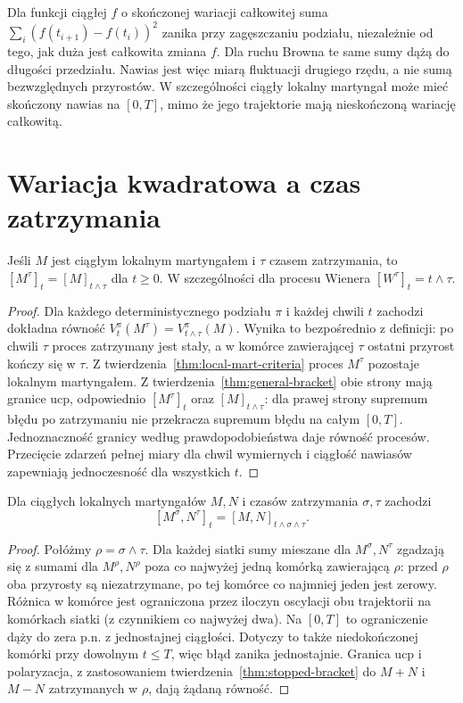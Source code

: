 \begin{uwaga}
Dla funkcji ciągłej $f$ o skończonej wariacji całkowitej
suma $\sum_i(f(t_{i+1})-f(t_i))^2$ zanika przy
zagęszczaniu podziału, niezależnie od tego, jak duża
jest całkowita zmiana $f$. Dla ruchu Browna te same
sumy dążą do długości przedziału. Nawias jest więc
miarą fluktuacji drugiego rzędu, a nie sumą bezwzględnych
przyrostów. W szczególności ciągły lokalny martyngał
może mieć skończony nawias na $[0,T]$, mimo że jego
trajektorie mają nieskończoną wariację całkowitą.
\end{uwaga}

\section{Wariacja kwadratowa a czas zatrzymania}
\begin{twierdzenie}
\label{thm:stopped-bracket}
Jeśli $M$ jest ciągłym lokalnym martyngałem i
$\tau$ czasem zatrzymania, to
$[M^\tau]_t=[M]_{t\wedge\tau}$ dla $t\ge0$.
W szczególności dla procesu Wienera
$[W^\tau]_t=t\wedge\tau$.
\end{twierdzenie}
\begin{proof}
Dla każdego deterministycznego podziału $\pi$ i każdej
chwili $t$ zachodzi dokładna równość
$V_t^\pi(M^\tau)=V_{t\wedge\tau}^\pi(M)$.
Wynika to bezpośrednio z definicji: po chwili $\tau$
proces zatrzymany jest stały, a w komórce zawierającej
$\tau$ ostatni przyrost kończy się w $\tau$.
Z twierdzenia~\ref{thm:local-mart-criteria} proces
$M^\tau$ pozostaje lokalnym martyngałem.
Z twierdzenia~\ref{thm:general-bracket} obie strony
mają granice ucp, odpowiednio $[M^\tau]_t$ oraz
$[M]_{t\wedge\tau}$: dla prawej strony supremum
błędu po zatrzymaniu nie przekracza supremum
błędu na całym $[0,T]$. Jednoznaczność granicy według
prawdopodobieństwa daje równość procesów.
Przecięcie zdarzeń pełnej miary dla chwil wymiernych
i ciągłość nawiasów zapewniają jednoczesność dla wszystkich $t$.
\end{proof}

\begin{wniosek}
\label{cor:cross-stopped-bracket}
Dla ciągłych lokalnych martyngałów $M,N$
i czasów zatrzymania $\sigma,\tau$ zachodzi
\[
[M^\sigma,N^\tau]_t=[M,N]_{t\wedge\sigma\wedge\tau}.
\]
\end{wniosek}
\begin{proof}
Połóżmy $\rho=\sigma\wedge\tau$.
Dla każdej siatki sumy mieszane dla $M^\sigma,N^\tau$
zgadzają się z sumami dla $M^\rho,N^\rho$
poza co najwyżej jedną komórką zawierającą $\rho$:
przed $\rho$ oba przyrosty są niezatrzymane,
po tej komórce co najmniej jeden jest zerowy.
Różnica w komórce jest ograniczona przez iloczyn
oscylacji obu trajektorii na komórkach siatki
(z czynnikiem co najwyżej dwa).
Na $[0,T]$ to ograniczenie dąży do zera p.n.
z jednostajnej ciągłości. Dotyczy to także
niedokończonej komórki przy dowolnym $t\le T$,
więc błąd zanika jednostajnie.
Granica ucp i polaryzacja, z zastosowaniem
twierdzenia~\ref{thm:stopped-bracket} do $M+N$
i $M-N$ zatrzymanych w $\rho$, dają żądaną równość.
\end{proof}

